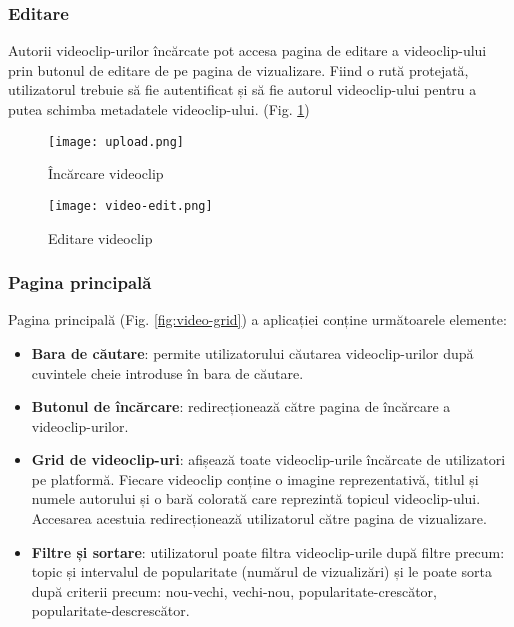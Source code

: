 \subsubsection{Editare}
Autorii videoclip-urilor încărcate pot accesa pagina de editare a videoclip-ului prin butonul
de editare de pe pagina de vizualizare. Fiind o rută protejată, utilizatorul trebuie să fie
autentificat și să fie autorul videoclip-ului pentru a putea schimba metadatele videoclip-ului.
(Fig. \ref{fig:video-edit})

\begin{figure}[h]
    \centering
    \begin{minipage}{0.49\textwidth}
        \centering
        \texttt{[image: upload.png]}
        \caption{Încărcare videoclip}
        \label{fig:upload}
    \end{minipage}\hfill
    \begin{minipage}{0.49\textwidth}
        \centering
        \texttt{[image: video-edit.png]}
        \caption{Editare videoclip}
        \label{fig:video-edit}
    \end{minipage}
\end{figure}

\subsubsection{Pagina principală}
Pagina principală (Fig. \ref{fig:video-grid}) a aplicației conține următoarele elemente:
\begin{itemize}
    \item \textbf{Bara de căutare}: permite utilizatorului căutarea videoclip-urilor după cuvintele
    cheie introduse în bara de căutare.
    \item \textbf{Butonul de încărcare}: redirecționează către pagina de încărcare a videoclip-urilor.
    \item \textbf{Grid de videoclip-uri}: afișează toate videoclip-urile încărcate de utilizatori pe
    platformă. Fiecare videoclip conține o imagine reprezentativă, titlul și numele autorului și o 
    bară colorată care reprezintă topicul videoclip-ului. Accesarea acestuia redirecționează utilizatorul
    către pagina de vizualizare.
    \item \textbf{Filtre și sortare}: utilizatorul poate filtra videoclip-urile după filtre precum: topic 
    și intervalul de popularitate (numărul de vizualizări) și le poate sorta după criterii precum: nou-vechi,
    vechi-nou, popularitate-crescător, popularitate-descrescător.
\end{itemize}

